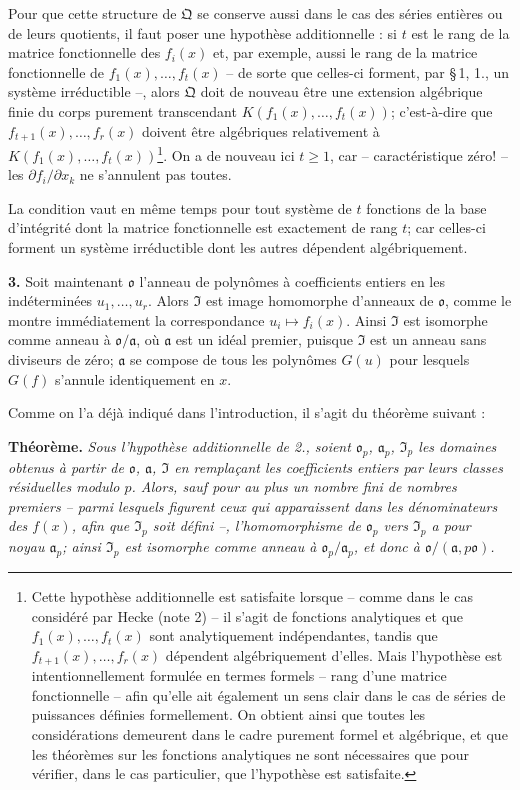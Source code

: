 Pour que cette structure de $\mathfrak{Q}$ se conserve aussi dans le cas des séries entières ou de leurs quotients, il faut poser une hypothèse additionnelle : si $t$ est le rang de la matrice fonctionnelle des $f_i(x)$ et, par exemple, aussi le rang de la matrice fonctionnelle de $f_1(x),\ldots,f_t(x)$ -- de sorte que celles-ci forment, par \S\,1, 1., un système irréductible --, alors $\mathfrak{Q}$ doit de nouveau être une extension algébrique finie du corps purement transcendant $K(f_1(x),\ldots,f_t(x))$; c'est-à-dire que $f_{t+1}(x),\ldots,f_r(x)$ doivent être algébriques relativement à $K(f_1(x),\ldots,f_t(x))$\footnote{Cette hypothèse additionnelle est satisfaite lorsque -- comme dans le cas considéré par Hecke (note 2) -- il s'agit de fonctions analytiques et que $f_1(x),\ldots,f_t(x)$ sont analytiquement indépendantes, tandis que $f_{t+1}(x),\ldots,f_r(x)$ dépendent algébriquement d'elles. Mais l'hypothèse est intentionnellement formulée en termes formels -- rang d'une matrice fonctionnelle -- afin qu'elle ait également un sens clair dans le cas de séries de puissances définies formellement. On obtient ainsi que toutes les considérations demeurent dans le cadre purement formel et algébrique, et que les théorèmes sur les fonctions analytiques ne sont nécessaires que pour vérifier, dans le cas particulier, que l'hypothèse est satisfaite.}. On a de nouveau ici $t\geq1$, car -- caractéristique zéro! -- les $\partial f_i/\partial x_k$ ne s'annulent pas toutes.

La condition vaut en même temps pour tout système de $t$ fonctions de la base d'intégrité dont la matrice fonctionnelle est exactement de rang $t$; car celles-ci forment un système irréductible dont les autres dépendent algébriquement.

\medskip
\noindent\textbf{3.}
Soit maintenant $\mathfrak{o}$ l'anneau de polynômes à coefficients entiers en les indéterminées $u_1,\ldots,u_r$. Alors $\mathfrak{I}$ est image homomorphe d'anneaux de $\mathfrak{o}$, comme le montre immédiatement la correspondance $u_i\mapsto f_i(x)$. Ainsi $\mathfrak{I}$ est isomorphe comme anneau à $\mathfrak{o}/\mathfrak{a}$, où $\mathfrak{a}$ est un idéal premier, puisque $\mathfrak{I}$ est un anneau sans diviseurs de zéro; $\mathfrak{a}$ se compose de tous les polynômes $G(u)$ pour lesquels $G(f)$ s'annule identiquement en $x$.

Comme on l'a déjà indiqué dans l'introduction, il s'agit du théorème suivant :

\medskip
\noindent\textbf{Théorème.}
\textit{Sous l'hypothèse additionnelle de 2., soient $\mathfrak{o}_p$, $\mathfrak{a}_p$, $\mathfrak{I}_p$ les domaines obtenus à partir de $\mathfrak{o}$, $\mathfrak{a}$, $\mathfrak{I}$ en remplaçant les coefficients entiers par leurs classes résiduelles modulo $p$. Alors, sauf pour au plus un nombre fini de nombres premiers -- parmi lesquels figurent ceux qui apparaissent dans les dénominateurs des $f(x)$, afin que $\mathfrak{I}_p$ soit défini --, l'homomorphisme de $\mathfrak{o}_p$ vers $\mathfrak{I}_p$ a pour noyau $\mathfrak{a}_p$; ainsi $\mathfrak{I}_p$ est isomorphe comme anneau à $\mathfrak{o}_p/\mathfrak{a}_p$, et donc à $\mathfrak{o}/(\mathfrak{a},p\mathfrak{o})$.}

